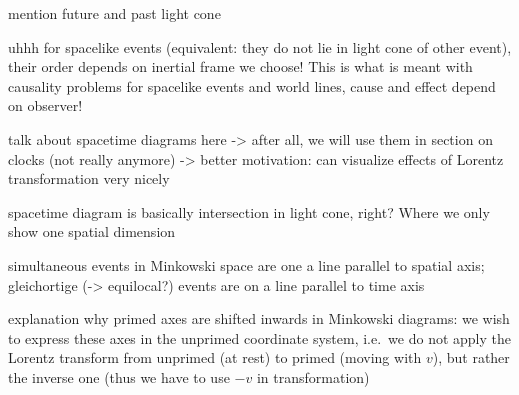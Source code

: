 mention future and past light cone


uhhh for spacelike events (equivalent: they do not lie in light cone of other event), their order depends on inertial frame we choose! This is what is meant with causality problems for spacelike events and world lines, cause and effect depend on observer!


talk about spacetime diagrams here -> after all, we will use them in section on clocks (not really anymore) -> better motivation: can visualize effects of Lorentz transformation very nicely

spacetime diagram is basically intersection in light cone, right? Where we only show one spatial dimension


simultaneous events in Minkowski space are one a line parallel to spatial axis; gleichortige (-> equilocal?) events are on a line parallel to time axis



explanation why primed axes are shifted inwards in Minkowski diagrams: we wish to express these axes in the unprimed coordinate system, i.e.~we do not apply the Lorentz transform from unprimed (at rest) to primed (moving with $v$), but rather the inverse one (thus we have to use $-v$ in transformation)



